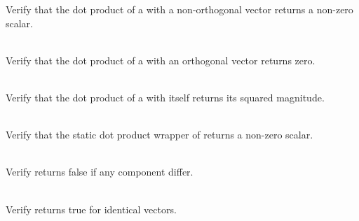 \begin{DoxyRefList}
\label{test__test000121}%
%
Verify that the dot product of a  with a non-\/orthogonal vector returns a non-\/zero scalar.  
\item[{\parbox[t]{\linewidth}{Member \doxylink{_product_tests_8cpp_a9dcbc7ae9fb013209a64e07340fa4d97}{Vector4\+DDot\+Product\+\_\+\+Orthogonal\+Dot\+Product\+Return\+Zero} ()}}]\hfill \\
\label{test__test000120}%
%
Verify that the dot product of a  with an orthogonal vector returns zero.  
\item[{\parbox[t]{\linewidth}{Member \doxylink{_product_tests_8cpp_a6365818c2ecff1a205344fbda9567bd9}{Vector4\+DDot\+Product\+\_\+\+Self\+Dot\+Product\+Returns\+Square\+Magnitude} ()}}]\hfill \\
\label{test__test000119}%
%
Verify that the dot product of a  with itself returns its squared magnitude.  
\item[{\parbox[t]{\linewidth}{Member \doxylink{_product_tests_8cpp_a256b4dd376ab96bfa500ffe679c8014a}{Vector4\+DDot\+Product\+\_\+\+Static\+Wrapper\+\_\+\+Non\+Orthogonal\+Dot\+Product\+Returns\+Non\+Zero\+Scalar} ()}}]\hfill \\
\label{test__test000122}%
%
Verify that the static dot product wrapper of  returns a non-\/zero scalar.  
\item[{\parbox[t]{\linewidth}{Member \doxylink{_equality_tests_8cpp_acaf91e72758144731131d18928043074}{Vector4\+DEquality\+\_\+\+Equality\+\_\+\+Different\+Vectors\+Returns\+False} ()}}]\hfill \\
\label{test__test000068}%
%
Verify  returns false if any component differ.  
\item[{\parbox[t]{\linewidth}{Member \doxylink{_equality_tests_8cpp_aa171fa1e931412815c2284ea0fb0def3}{Vector4\+DEquality\+\_\+\+Equality\+\_\+\+Identical\+Vectors\+Returns\+True} ()}}]\hfill \\
\label{test__test000067}%
%
Verify  returns true for identical vectors.  
\item[{\parbox[t]{\linewidth}{Member \doxylink{_equality_tests_8cpp_a9cab8697516fcfe0f835530c5ef41121}{Vector4\+DEquality\+\_\+\+Equality\+Operator\+\_\+\+Different\+Boolean\+Vectors\+Returns\+False} ()}}]\hfill \\

\end{DoxyRefList}
